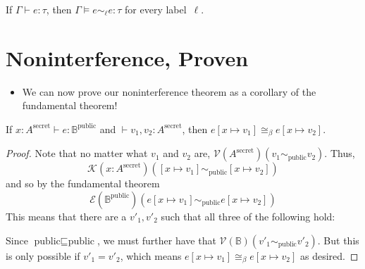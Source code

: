 \documentclass{lecturenotes}
\newcommand{\pub}{\text{public}}
\newcommand{\priv}{\text{secret}}
\begin{document}
\begin{thm}
  If $\Gamma \vdash e : \tau$, then $\Gamma \vDash e \sim_\ell e : \tau$ for every label~$\ell$.
\end{thm}

\section{Noninterference, Proven}
\label{sec:nonint-prov}

\begin{itemize}
\item We can now prove our noninterference theorem as a corollary of the fundamental theorem!
\end{itemize}

\begin{cor}[Noninterference]
  If $x : A^\priv \vdash e : \mathbb{B}^\pub$ and $\vdash v_1, v_2 : A^\priv$, then $e[x \mapsto v_1] \cong_{\beta} e[x \mapsto v_2]$.
\end{cor}
\begin{proof}
  Note that no matter what $v_1$ and $v_2$ are, $\mathcal{V}(A^\priv)(v_1 \sim_\pub v_2)$.
  Thus, $$\mathcal{K}(x : A^\priv)([x \mapsto v_1] \sim_\pub [x \mapsto v_2])$$ and so by the fundamental theorem $$\mathcal{E}(\mathbb{B}^\pub)(e[x \mapsto v_1] \sim_\pub e[x \mapsto v_2])$$
  This means that there are a $v'_1, v'_2$ such that all three of the following hold:
  Since $\pub \sqsubseteq \pub$, we must further have that $\mathcal{V}(\mathbb{B})(v'_1 \sim_\pub v'_2)$.
  But this is only possible if $v'_1 = v'_2$, which means $e[x \mapsto v_1] \cong_\beta e[x \mapsto v_2]$ as desired.
\end{proof}
\end{document}
